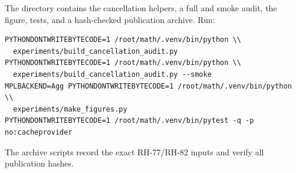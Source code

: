 \documentclass[11pt]{article}
\theoremstyle{definition}
\theoremstyle{remark}
\begin{document}
The directory contains the cancellation helpers, a full and smoke audit, the
figure, tests, and a hash-checked publication archive.  Run:
\begin{verbatim}
PYTHONDONTWRITEBYTECODE=1 /root/math/.venv/bin/python \\
  experiments/build_cancellation_audit.py
PYTHONDONTWRITEBYTECODE=1 /root/math/.venv/bin/python \\
  experiments/build_cancellation_audit.py --smoke
MPLBACKEND=Agg PYTHONDONTWRITEBYTECODE=1 /root/math/.venv/bin/python \\
  experiments/make_figures.py
PYTHONDONTWRITEBYTECODE=1 /root/math/.venv/bin/pytest -q -p no:cacheprovider
\end{verbatim}
The archive scripts record the exact RH-77/RH-82 inputs and verify all
publication hashes.



\end{document}
